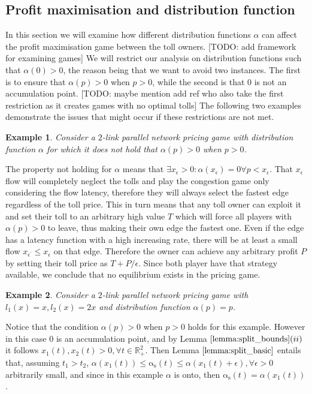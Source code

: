 \documentclass[a4paper,11pt]{article}
\newcommand{\as}{\mathrm{\alpha_s}}
\newcommand{\R}{\mathbb{R}}
\newtheorem{example}{Example}[section]
\begin{document}
\subsection{Profit maximisation and distribution function}

In this section we will examine how different distribution functions $\alpha$ can affect the profit maximisation game between the toll owners.
[TODO: add framework for examining games]
We will restrict our analysis on distribution functions such that $\alpha(0) > 0$, the reason being that we want to avoid two instances.
The first is to ensure that $\alpha(p) > 0$ when $p > 0$, while the second is that $0$ is not an accumulation point.
[TODO: maybe mention add ref who also take the first restriction as it creates games with no optimal tolls]
The following two examples demonstrate the issues that might occur if these restrictions are not met.

\begin{example}
	Consider a $2$-link parallel network pricing game with distribution function $\alpha$ for which it does not hold that $\alpha(p) > 0$ when $p > 0$.
\end{example}

The property not holding for $\alpha$ means that $\exists x_\epsilon > 0 : \alpha(x_\epsilon) = 0 \forall p < x_\epsilon$.
That $x_\epsilon$ flow will completely neglect the tolls and play the congestion game only considering the flow latency, therefore they will always select the fastest edge regardless of the toll price.
This in turn means that any toll owner can exploit it and set their toll to an arbitrary high value $T$ which will force all players with $\alpha(p) > 0$ to leave, thus making their own edge the fastest one.
Even if the edge has a latency function with a high increasing rate, there will be at least a small flow $x_{\epsilon^\prime} \le x_\epsilon$ on that edge.
Therefore the owner can achieve any arbitrary profit $P$ by setting their toll price as $T + P/\epsilon$.
Since both player have that strategy available, we conclude that no equilibrium exists in the pricing game.

\begin{example}
	\label{example:a_0_ap}
	Consider a $2$-link parallel network pricing game with $l_1(x) = x, l_2(x) = 2x$ and distribution function $\alpha(p) = p$.
\end{example}

Notice that the condition $\alpha(p) > 0$ when $p > 0$ holds for this example.
However in this case $0$ is an accumulation point, and by Lemma $\ref{lemma:split_bounds}(ii)$ it follows $x_1(t), x_2(t) > 0, \forall t \in \R_+^2$.
Then Lemma $\ref{lemma:split_basic}$ entails that, assuming $t_1 > t_2$, $\alpha(x_1(t)) \le \as(t) \le \alpha(x_1(t) + \epsilon), \forall \epsilon > 0$ arbitrarily small, and since in this example $\alpha$ is onto, then $\as(t) = \alpha(x_1(t))$.
\end{document}
